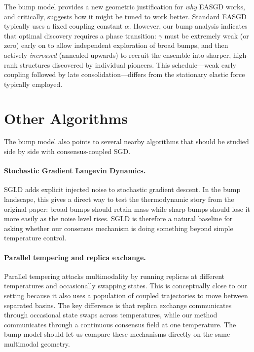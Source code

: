 \documentclass{article}
\begin{document}
The bump model provides a new geometric justification for \emph{why} EASGD works, and critically, suggests how it might be tuned to work better. Standard EASGD typically uses a fixed coupling constant $\alpha$. However, our bump analysis indicates that optimal discovery requires a phase transition: $\gamma$ must be extremely weak (or zero) early on to allow independent exploration of broad bumps, and then actively \emph{increased} (annealed upwards) to recruit the ensemble into sharper, high-rank structures discovered by individual pioneers. This schedule---weak early coupling followed by late consolidation---differs from the stationary elastic force typically employed.

\section{Other Algorithms}

The bump model also points to several nearby algorithms that should be
studied side by side with consensus-coupled SGD.

\paragraph{Stochastic Gradient Langevin Dynamics.}
SGLD \cite{welling2011bayesian} adds explicit injected noise to
stochastic gradient descent. In the bump landscape, this gives a direct
way to test the thermodynamic story from the original paper: broad bumps
should retain mass while sharp bumps should lose it more easily as the
noise level rises. SGLD is therefore a natural baseline for asking
whether our consensus mechanism is doing something beyond simple
temperature control.

\paragraph{Parallel tempering and replica exchange.}
Parallel tempering \cite{earl2005parallel} attacks multimodality by
running replicas at different temperatures and occasionally swapping
states. This is conceptually close to our setting because it also uses a
population of coupled trajectories to move between separated basins. The
key difference is that replica exchange communicates through occasional
state swaps across temperatures, while our method communicates through a
continuous consensus field at one temperature. The bump model should let
us compare these mechanisms directly on the same multimodal geometry.
\end{document}
